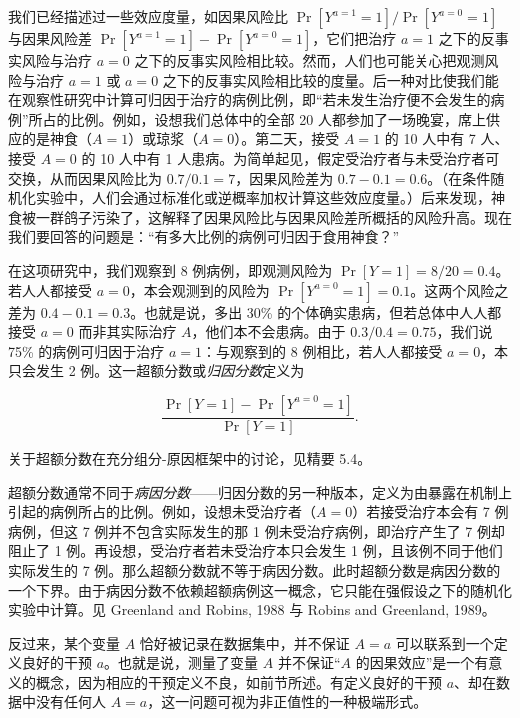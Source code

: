 \renewcommand{\FPname}{精要（Fine Point）}
\begin{finepoint}[归因分数]
我们已经描述过一些效应度量，如因果风险比 $\Pr[Y^{a=1}=1]/\Pr[Y^{a=0}=1]$ 与因果风险差 $\Pr[Y^{a=1}=1]-\Pr[Y^{a=0}=1]$，它们把治疗 $a=1$ 之下的反事实风险与治疗 $a=0$ 之下的反事实风险相比较。然而，人们也可能关心把观测风险与治疗 $a=1$ 或 $a=0$ 之下的反事实风险相比较的度量。后一种对比使我们能在观察性研究中计算可归因于治疗的病例比例，即“若未发生治疗便不会发生的病例”所占的比例。例如，设想我们总体中的全部 20 人都参加了一场晚宴，席上供应的是神食（$A=1$）或琼浆（$A=0$）。第二天，接受 $A=1$ 的 10 人中有 7 人、接受 $A=0$ 的 10 人中有 1 人患病。为简单起见，假定受治疗者与未受治疗者可交换，从而因果风险比为 $0.7/0.1=7$，因果风险差为 $0.7-0.1=0.6$。（在条件随机化实验中，人们会通过标准化或逆概率加权计算这些效应度量。）后来发现，神食被一群鸽子污染了，这解释了因果风险比与因果风险差所概括的风险升高。现在我们要回答的问题是：“有多大比例的病例可归因于食用神食？”

在这项研究中，我们观察到 8 例病例，即观测风险为 $\Pr[Y=1]=8/20=0.4$。若人人都接受 $a=0$，本会观测到的风险为 $\Pr[Y^{a=0}=1]=0.1$。这两个风险之差为 $0.4-0.1=0.3$。也就是说，多出 30\% 的个体确实患病，但若总体中人人都接受 $a=0$ 而非其实际治疗 $A$，他们本不会患病。由于 $0.3/0.4=0.75$，我们说 75\% 的病例可归因于治疗 $a=1$：与观察到的 8 例相比，若人人都接受 $a=0$，本只会发生 2 例。这一超额分数或\emph{归因分数}定义为

\[
\frac{\Pr[Y=1]-\Pr[Y^{a=0}=1]}{\Pr[Y=1]}.
\]

关于超额分数在充分组分-原因框架中的讨论，见精要 5.4。

超额分数通常不同于\emph{病因分数}——归因分数的另一种版本，定义为由暴露在机制上引起的病例所占的比例。例如，设想未受治疗者（$A=0$）若接受治疗本会有 7 例病例，但这 7 例并不包含实际发生的那 1 例未受治疗病例，即治疗产生了 7 例却阻止了 1 例。再设想，受治疗者若未受治疗本只会发生 1 例，且该例不同于他们实际发生的 7 例。那么超额分数就不等于病因分数。此时超额分数是病因分数的一个下界。由于病因分数不依赖超额病例这一概念，它只能在强假设之下的随机化实验中计算。见 Greenland and Robins, 1988 与 Robins and Greenland, 1989。
\end{finepoint}
\renewcommand{\FPname}{精要}

反过来，某个变量 $A$ 恰好被记录在数据集中，并不保证 $A=a$ 可以联系到一个定义良好的干预 $a$。也就是说，测量了变量 $A$ 并不保证“$A$ 的因果效应”是一个有意义的概念，因为相应的干预定义不良，如前节所述。有定义良好的干预 $a$、却在数据中没有任何人 $A=a$，这一问题可视为非正值性的一种极端形式。

